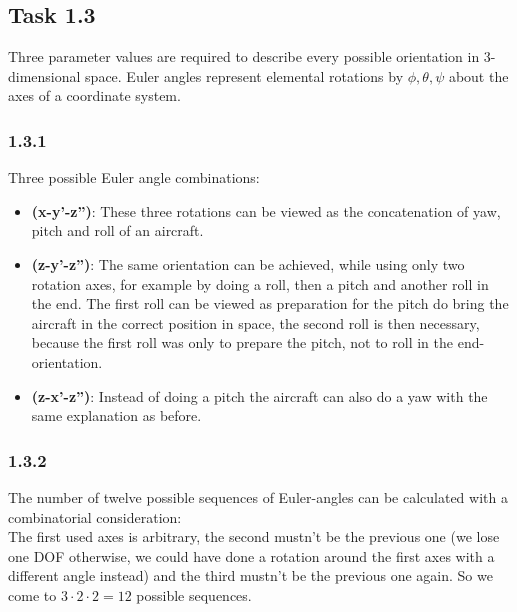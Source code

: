 \subsection*{Task 1.3}
Three parameter values are required to describe every possible orientation in 3-dimensional space.
Euler angles represent elemental rotations by $\phi,\theta,\psi$ about the axes of a coordinate system.\\

\subsubsection*{1.3.1}
Three possible Euler angle combinations:
\begin{itemize}
	\item \textbf{(x-y'-z'')}: These three rotations can be viewed as the concatenation of yaw, pitch and roll of an aircraft.
	\item \textbf{(z-y'-z'')}: The same orientation can be achieved, while using only two rotation axes, for example by doing a roll, then a pitch and another roll in the end. The first roll can be viewed as preparation for the pitch do bring the aircraft in the correct position in space, the second roll is then necessary, because the first roll was only to prepare the pitch, not to roll in the end-orientation.
	\item \textbf{(z-x'-z'')}: Instead of doing a pitch the aircraft can also do a yaw with the same explanation as before.
\end{itemize}

\subsubsection*{1.3.2}
The number of twelve possible sequences of Euler-angles can be calculated with a combinatorial consideration:\\
The first used axes is arbitrary, the second mustn't be the previous one (we lose one DOF otherwise, we could have done a rotation around the first axes with a different angle instead) and the third mustn't be the previous one again. So we come to $3\cdot 2\cdot 2 = 12$ possible sequences.